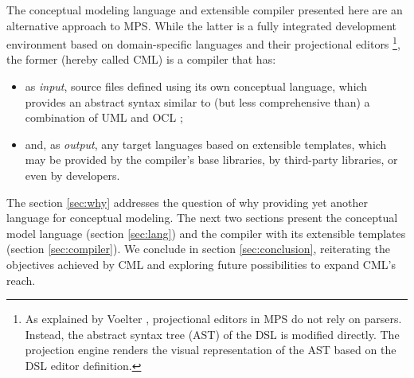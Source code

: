 The conceptual modeling language and extensible compiler presented here are an alternative approach to MPS.
While the latter is a fully integrated development environment based on domain-specific languages and their projectional editors \footnote{As explained by Voelter \cite{voelter}, projectional editors in MPS do not rely on parsers.
Instead, the abstract syntax tree (AST) of the DSL is modified directly.
The projection engine renders the visual representation of the AST based on the DSL editor definition.},
the former (hereby called CML) is a compiler that has:
\begin{itemize}
\item as \emph{input}, source files defined using its own conceptual language,
which provides an abstract syntax similar to (but less comprehensive than) a combination of UML \cite{uml} and OCL \cite{ocl}; 
\item and, as \emph{output}, any target languages based on extensible templates,
which may be provided by the compiler's base libraries, by third-party libraries, or even by developers.
\end{itemize}

The section \ref{sec:why} addresses the question of why providing yet another language for conceptual modeling.
The next two sections present the conceptual model language (section \ref{sec:lang}) and the compiler with its extensible templates (section \ref{sec:compiler}).
We conclude in section \ref{sec:conclusion},
reiterating the objectives achieved by CML and exploring future possibilities to expand CML's reach.

